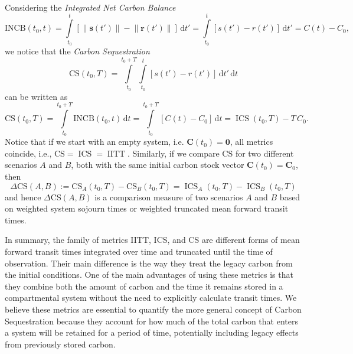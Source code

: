 \documentclass[9pt,twoside,lineno]{pnas-new_SI}
\newcommand{\CS}{\mathrm{CS}}
\newcommand{\INCB}{\mathrm{INCB}}
\newcommand{\IITT}{\operatorname{IITT}}
\newcommand{\ICS}{\operatorname{ICS}}
\newcommand{\intl}{\int\limits}
\newcommand{\dd}[1]{\,\mathrm{d}#1}
\renewcommand{\vec}[1]{\mathbf{#1}}
\newcommand{\vnorm}[1]{\left\|#1\right\|}
\begin{document}
Considering the \emph{Integrated Net Carbon Balance}
\begin{equation}
    \INCB(t_0,t) = \intl_{t_0}^{t}\left[\vnorm{\vec{s}(t')}-\vnorm{\vec{r}(t')}\right]\dd{t'} = \intl_{t_0}^t \left[s(t')-r(t')\right]\dd{t'} = C(t)-C_0,
\end{equation}
we notice that the \emph{Carbon Sequestration}
\begin{equation}
    \CS(t_0,T) = \intl_{t_0}^{t_0+T} \intl_{t_0}^t \left[s(t')-r(t')\right]\dd{t'}\dd{t}
\end{equation}
can be written as
\begin{equation}
    \CS(t_0,T) = \intl_{t_0}^{t_0+T} \INCB(t_0,t)\dd{t} = \intl_{t_0}^{t_0+T} \left[C(t) - C_0\right]\dd{t} = \ICS(t_0,T) - T\,C_0.
\end{equation}
Notice that if we start with an empty system, i.e. $\vec{C}(t_0) = \vec{0}$, all metrics coincide, i.e.,  $\CS = \ICS = \IITT$. 
Similarly, if we compare $\CS$ for two different scenarios $A$ and $B$, both with the same initial carbon stock vector $\vec{C}(t_0)=\vec{C}_0$, then
\begin{equation}
    \label{eqn:Delta_CS}
    \Delta\CS(A,B) := \CS_A(t_0,T) - \CS_B(t_0,T) = \ICS_A(t_0,T) - \ICS_B(t_0,T)
\end{equation}
and hence $\Delta\CS(A,B)$ is a comparison measure of two scenarios $A$ and $B$ based on weighted system sojourn times or weighted truncated mean forward transit times.

In summary, the family of metrics IITT, ICS, and CS are different forms of mean forward transit times integrated over time and truncated until the time of observation. Their main difference is the way they treat the legacy carbon from the initial conditions. One of the main advantages of using these metrics is that they combine both the amount of carbon and the time it remains stored in a compartmental system without the need to explicitly calculate transit times. We believe these metrics are essential to quantify the more general concept of Carbon Sequestration because they account for how much of the total carbon that enters a system will be retained for a period of time, potentially including legacy effects from previously stored carbon. 
\end{document}
